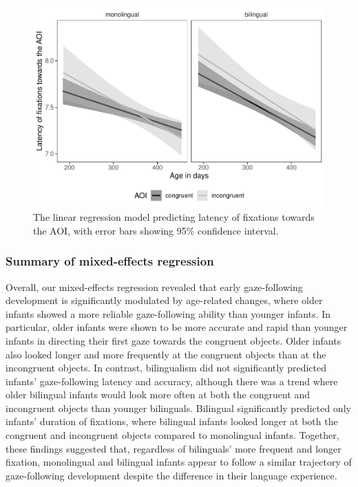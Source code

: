 \documentclass[,man,floatsintext]{apa6}
\begin{document}
\begin{figure}
\centering
\includegraphics{gaze-following-paper_files/figure-latex/fig9-1.pdf}
\caption{\label{fig:fig9}The linear regression model predicting latency of fixations towards the AOI, with error bars showing 95\% confidence interval.}
\end{figure}

\hypertarget{summary-of-mixed-effects-regression}{%
\subsubsection{Summary of mixed-effects regression}\label{summary-of-mixed-effects-regression}}

Overall, our mixed-effects regression revealed that early gaze-following development is significantly modulated by age-related changes, where older infants showed a more reliable gaze-following ability than younger infants. In particular, older infants were shown to be more accurate and rapid than younger infants in directing their first gaze towards the congruent objects. Older infants also looked longer and more frequently at the congruent objects than at the incongruent objects. In contrast, bilingualism did not significantly predicted infants' gaze-following latency and accuracy, although there was a trend where older bilingual infants would look more often at both the congruent and incongruent objects than younger bilinguals. Bilingual significantly predicted only infants' duration of fixations, where bilingual infants looked longer at both the congruent and incongruent objects compared to monolingual infants. Together, these findings suggested that, regardless of bilinguals' more frequent and longer fixation, monolingual and bilingual infants appear to follow a similar trajectory of gaze-following development despite the difference in their language experience.
\end{document}

